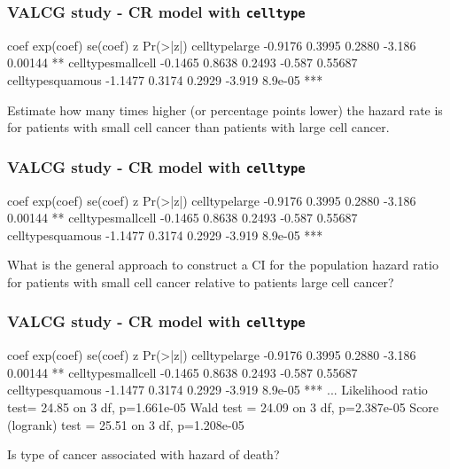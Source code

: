 \begin{frame}[fragile]
\frametitle{VALCG study - CR model with \texttt{celltype}}
\begin{Rout}{-.05}
                     coef exp(coef) se(coef)      z Pr(>|z|)
celltypelarge     -0.9176    0.3995   0.2880 -3.186  0.00144 **
celltypesmallcell -0.1465    0.8638   0.2493 -0.587  0.55687
celltypesquamous  -1.1477    0.3174   0.2929 -3.919  8.9e-05 ***
\end{Rout}
Estimate how many times higher (or percentage points lower) the hazard rate is for patients with small cell cancer than patients with large cell cancer.
\vskip200pt
\end{frame}


\begin{frame}[fragile]
\frametitle{VALCG study - CR model with \texttt{celltype}}
\begin{Rout}{-.05}
                     coef exp(coef) se(coef)      z Pr(>|z|)
celltypelarge     -0.9176    0.3995   0.2880 -3.186  0.00144 **
celltypesmallcell -0.1465    0.8638   0.2493 -0.587  0.55687
celltypesquamous  -1.1477    0.3174   0.2929 -3.919  8.9e-05 ***
\end{Rout}
What is the general approach to construct a CI for the population hazard ratio for patients with small cell cancer relative to patients large cell cancer?
\vskip200pt
\end{frame}

\begin{frame}[fragile]
\frametitle{VALCG study - CR model with \texttt{celltype}}
\begin{Rout}{-.05}
                     coef exp(coef) se(coef)      z Pr(>|z|)
celltypelarge     -0.9176    0.3995   0.2880 -3.186  0.00144 **
celltypesmallcell -0.1465    0.8638   0.2493 -0.587  0.55687
celltypesquamous  -1.1477    0.3174   0.2929 -3.919  8.9e-05 ***
...
Likelihood ratio test= 24.85  on 3 df,   p=1.661e-05
Wald test            = 24.09  on 3 df,   p=2.387e-05
Score (logrank) test = 25.51  on 3 df,   p=1.208e-05
\end{Rout}
Is type of cancer associated with hazard of death?
\vskip200pt
\end{frame}


 